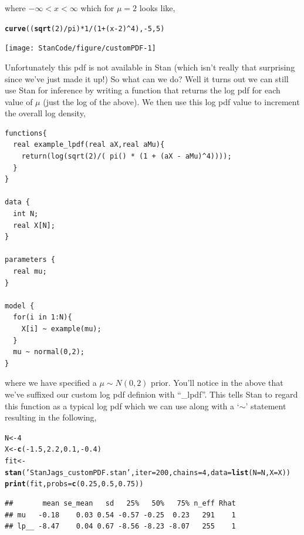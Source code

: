 \documentclass[11pt,fullpage]{book}
\makeatletter
\newenvironment{kframe}{%
	\def\at@end@of@kframe{}%
	\ifinner\ifhmode%
	\def\at@end@of@kframe{\end{minipage}}%
\begin{minipage}{\columnwidth}%
	\fi\fi%
	\def\FrameCommand##1{\hskip\@totalleftmargin \hskip-\fboxsep
		\colorbox{shadecolor}{##1}\hskip-\fboxsep
		\hskip-\linewidth \hskip-\@totalleftmargin \hskip\columnwidth}%
	\MakeFramed {\advance\hsize-\width
		\@totalleftmargin\z@ \linewidth\hsize
		\@setminipage}}%
{\par\unskip\endMakeFramed%
	\at@end@of@kframe}
\newcommand{\hlnum}[1]{\textcolor[rgb]{0.686,0.059,0.569}{#1}}%
\newcommand{\hlstr}[1]{\textcolor[rgb]{0.192,0.494,0.8}{#1}}%
\newcommand{\hlopt}[1]{\textcolor[rgb]{0,0,0}{#1}}%
\newcommand{\hlstd}[1]{\textcolor[rgb]{0.345,0.345,0.345}{#1}}%
\newcommand{\hlkwb}[1]{\textcolor[rgb]{0.69,0.353,0.396}{#1}}%
\newcommand{\hlkwc}[1]{\textcolor[rgb]{0.333,0.667,0.333}{#1}}%
\newcommand{\hlkwd}[1]{\textcolor[rgb]{0.737,0.353,0.396}{\textbf{#1}}}%
\newenvironment{knitrout}{}{} %
\makeatother
\begin{document}
where $-\infty < x < \infty$ which for $\mu=2$ looks like,


\begin{knitrout}\small
\begin{kframe}
\begin{alltt}
\hlkwd{curve}\hlstd{((}\hlkwd{sqrt}\hlstd{(}\hlnum{2}\hlstd{)}\hlopt{/}\hlstd{pi)}\hlopt{*}\hlnum{1}\hlopt{/}\hlstd{(}\hlnum{1}\hlopt{+}\hlstd{(x}\hlopt{-}\hlnum{2}\hlstd{)}\hlopt{^}\hlnum{4}\hlstd{),}\hlopt{-}\hlnum{5}\hlstd{,}\hlnum{5}\hlstd{)}
\end{alltt}
\end{kframe}
\texttt{[image: StanCode/figure/customPDF-1]} 
	\end{knitrout}

Unfortunately this pdf is not available in Stan (which isn't really that surprising since we've just made it up!) So what can we do? Well it turns out we can still use Stan for inference by writing a function that returns the log pdf for each value of $\mu$ (just the log of the above). We then use this log pdf value to increment the overall log density,

\begin{verbatim}
functions{
  real example_lpdf(real aX,real aMu){
    return(log(sqrt(2)/( pi() * (1 + (aX - aMu)^4))));
  }
}

data { 
  int N; 
  real X[N]; 
} 

parameters { 
  real mu; 
}

model { 
  for(i in 1:N){
    X[i] ~ example(mu);
  }
  mu ~ normal(0,2);
}
\end{verbatim}

where we have specified a $\mu \sim N(0,2)$ prior. You'll notice in the above that we've suffixed our custom log pdf definion with ``\_lpdf''. This tells Stan to regard this function as a typical log pdf which we can use along with a `$\sim$' statement resulting in the following,


\begin{knitrout}\small
		\color{fgcolor}\begin{kframe}
			\begin{alltt}
\hlstd{N} \hlkwb{<-} \hlnum{4}
\hlstd{X} \hlkwb{<-} \hlkwd{c}\hlstd{(}\hlopt{-}\hlnum{1.5}\hlstd{,}\hlnum{2.2}\hlstd{,}\hlnum{0.1}\hlstd{,}\hlopt{-}\hlnum{0.4}\hlstd{)}
\hlstd{fit} \hlkwb{<-} \hlkwd{stan}\hlstd{(}\hlstr{'StanJags_customPDF.stan'}\hlstd{,}\hlkwc{iter}\hlstd{=}\hlnum{200}\hlstd{,}\hlkwc{chains}\hlstd{=}\hlnum{4}\hlstd{,}\hlkwc{data}\hlstd{=}\hlkwd{list}\hlstd{(}\hlkwc{N}\hlstd{=N,}\hlkwc{X}\hlstd{=X))}
\hlkwd{print}\hlstd{(fit,}\hlkwc{probs} \hlstd{=} \hlkwd{c}\hlstd{(}\hlnum{0.25}\hlstd{,} \hlnum{0.5}\hlstd{,} \hlnum{0.75}\hlstd{))}
			\end{alltt}
			\begin{verbatim}
##       mean se_mean   sd   25%   50%   75% n_eff Rhat
## mu   -0.18    0.03 0.54 -0.57 -0.25  0.23   291    1
## lp__ -8.47    0.04 0.67 -8.56 -8.23 -8.07   255    1
			\end{verbatim}
		\end{kframe}
	\end{knitrout}
\end{document}

